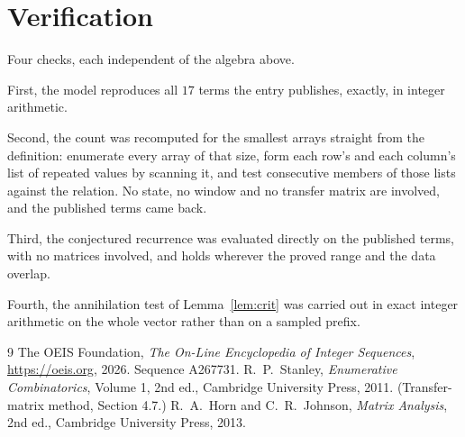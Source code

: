 \documentclass[11pt,a4paper]{article}
\theoremstyle{plain}
\theoremstyle{definition}
\begin{document}
\section{Verification}

Four checks, each independent of the algebra above.

First, the model reproduces all $17$ terms the entry publishes, exactly, in integer
arithmetic.

Second, the count was recomputed for the smallest arrays straight from the definition:
enumerate every array of that size, form each row's and each column's list of repeated values
by scanning it, and test consecutive members of those lists against the relation. No state, no
window and no transfer matrix are involved, and the published terms came back.

Third, the conjectured recurrence was evaluated directly on the published terms, with no
matrices involved, and holds wherever the proved range and the data overlap.

Fourth, the annihilation test of Lemma~\ref{lem:crit} was carried out in exact integer
arithmetic on the whole vector rather than on a sampled prefix.

\begin{thebibliography}{9}
 The OEIS Foundation, \emph{The On-Line Encyclopedia of Integer
Sequences}, \url{https://oeis.org}, 2026. Sequence A267731.
 R.~P.~Stanley, \emph{Enumerative Combinatorics}, Volume 1, 2nd ed.,
Cambridge University Press, 2011. (Transfer-matrix method, Section 4.7.)
 R.~A.~Horn and C.~R.~Johnson, \emph{Matrix Analysis}, 2nd ed., Cambridge
University Press, 2013.
\end{thebibliography}
\end{document}
